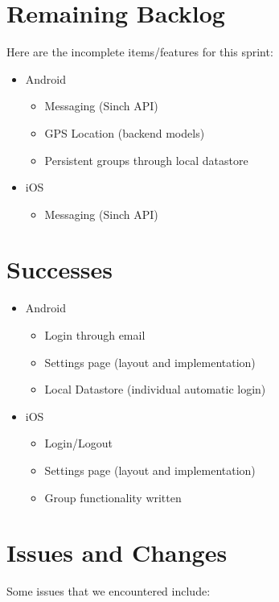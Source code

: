 \documentclass[11pt]{article}
\begin{document}
\section*{Remaining Backlog}
Here are the incomplete items/features for this sprint:
	\begin{itemize}
		\item Android
		\begin{itemize}
			\item Messaging (Sinch API)
			\item GPS Location (backend models)
			\item Persistent groups through local datastore
		\end{itemize}
		
		\item iOS
		\begin{itemize}
			\item Messaging (Sinch API)
		\end{itemize}
	\end{itemize}

\section*{Successes}

	\begin{itemize}
		\item Android
		\begin{itemize}
			\item Login through email
			\item Settings page (layout and implementation)
			\item Local Datastore (individual automatic login)
		\end{itemize}
		
		\item iOS
		\begin{itemize}
			\item Login/Logout
			\item Settings page (layout and implementation)
			\item Group functionality written
		\end{itemize}
	\end{itemize}


\section*{Issues and Changes}
Some issues that we encountered include:
\end{document}
